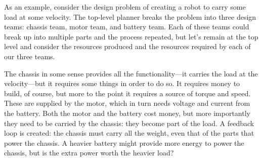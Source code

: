 \documentclass[7Sketches]{subfiles}
\begin{document}
As an example, consider the design problem of creating a robot to carry some load at some velocity. The top-level planner breaks the problem into three design teams: chassis team, motor team, and battery team. Each of these teams could break up into multiple parts and the process repeated, but let's remain at the top level and consider the resources produced and the resources required by each of our three teams.

The chassis in some sense provides all the functionality---it carries the load at the velocity---but it requires some things in order to do so. It requires money to build, of course, but more to the point it requires a source of torque and speed. These are supplied by the motor, which in turn needs voltage and current from the battery. Both the motor and the battery cost money, but more importantly they need to be carried by the chassis: they become part of the load. A feedback loop is created: the chassis must carry all the weight, even that of the parts that power the chassis. A heavier battery might provide more energy to power the chassis, but is the extra power worth the heavier load?
\end{document}
